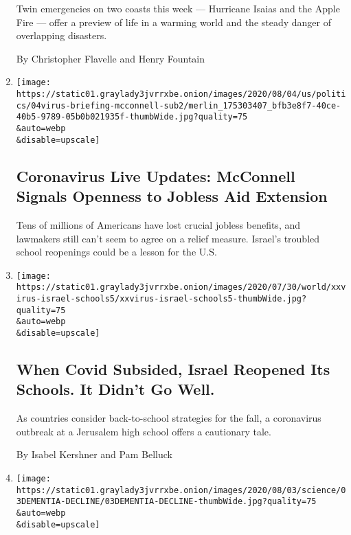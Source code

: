 \begin{enumerate}
  Twin emergencies on two coasts this week --- Hurricane Isaias and the
  Apple Fire --- offer a preview of life in a warming world and the
  steady danger of overlapping disasters.

  By Christopher Flavelle and Henry Fountain
\item
  \href{/2020/08/04/world/coronavirus-cases.html}{}

  \texttt{[image: https://static01.graylady3jvrrxbe.onion/images/2020/08/04/us/politics/04virus-briefing-mcconnell-sub2/merlin\_175303407\_bfb3e8f7-40ce-40b5-9789-05b0b021935f-thumbWide.jpg?quality=75\\\&auto=webp\\\&disable=upscale]}

  \hypertarget{coronavirus-live-updates-mcconnell-signals-openness-to-jobless-aid-extension}{%
  \subsection{Coronavirus Live Updates: McConnell Signals Openness to
  Jobless Aid
  Extension}\label{coronavirus-live-updates-mcconnell-signals-openness-to-jobless-aid-extension}}

  Tens of millions of Americans have lost crucial jobless benefits, and
  lawmakers still can't seem to agree on a relief measure. Israel's
  troubled school reopenings could be a lesson for the U.S.
\item
  \href{/2020/08/04/world/middleeast/coronavirus-israel-schools-reopen.html}{}

  \texttt{[image: https://static01.graylady3jvrrxbe.onion/images/2020/07/30/world/xxvirus-israel-schools5/xxvirus-israel-schools5-thumbWide.jpg?quality=75\\\&auto=webp\\\&disable=upscale]}

  \hypertarget{when-covid-subsided-israel-reopened-its-schools-it-didnt-go-well}{%
  \subsection{When Covid Subsided, Israel Reopened Its Schools. It
  Didn't Go
  Well.}\label{when-covid-subsided-israel-reopened-its-schools-it-didnt-go-well}}

  As countries consider back-to-school strategies for the fall, a
  coronavirus outbreak at a Jerusalem high school offers a cautionary
  tale.

  By Isabel Kershner and Pam Belluck
\item
  \href{/2020/08/03/health/alzheimers-dementia-rates.html}{}

  \texttt{[image: https://static01.graylady3jvrrxbe.onion/images/2020/08/03/science/03DEMENTIA-DECLINE/03DEMENTIA-DECLINE-thumbWide.jpg?quality=75\\\&auto=webp\\\&disable=upscale]}


\end{enumerate}
